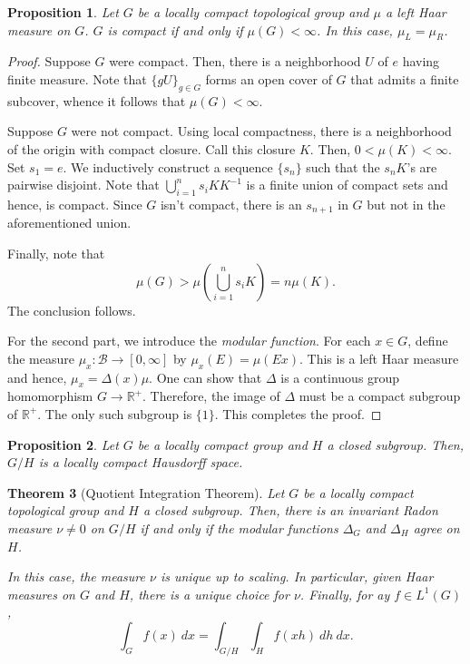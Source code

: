 \documentclass[12pt]{article}
\theoremstyle{thmstyle}
\newtheorem{theorem}{Theorem}[section]
\newtheorem{proposition}[theorem]{Proposition}
\theoremstyle{defstyle}
\newcommand{\R}{\mathbb{R}}
\newcommand{\scrB}{\mathscr B}
\begin{document}
\begin{proposition}
    Let $G$ be a locally compact topological group and $\mu$ a left Haar measure on $G$. $G$ is compact if and only if $\mu(G) < \infty$. In this case, $\mu_L = \mu_R$.
\end{proposition}
\begin{proof}
    Suppose $G$ were compact. Then, there is a neighborhood $U$ of $e$ having finite measure. Note that $\{gU\}_{g\in G}$ forms an open cover of $G$ that admits a finite subcover, whence it follows that $\mu(G) < \infty$.
    
    Suppose $G$ were not compact. Using local compactness, there is a neighborhood of the origin with compact closure. Call this closure $K$. Then, $0 < \mu(K) < \infty$. Set $s_1 = e$. We inductively construct a sequence $\{s_n\}$ such that the $s_nK$'s are pairwise disjoint. Note that $\bigcup_{i = 1}^n s_i KK^{-1}$ is a finite union of compact sets and hence, is compact. Since $G$ isn't compact, there is an $s_{n + 1}$ in $G$ but not in the aforementioned union. 

    Finally, note that 
    \begin{equation*}
        \mu(G) > \mu\left(\bigcup_{i = 1}^n s_iK\right) = n\mu(K).
    \end{equation*}
    The conclusion follows.

    For the second part, we introduce the \emph{modular function}. For each $x\in G$, define the measure $\mu_x:\scrB\to[0,\infty]$ by $\mu_x(E) = \mu(Ex)$. This is a left Haar measure and hence, $\mu_x = \Delta(x)\mu$. One can show that $\Delta$ is a continuous group homomorphism $G\to\R^+$. Therefore, the image of $\Delta$ must be a compact subgroup of $\R^+$. The only such subgroup is $\{1\}$. This completes the proof.
\end{proof}

\begin{proposition}
    Let $G$ be a locally compact group and $H$ a closed subgroup. Then, $G/H$ is a locally compact Hausdorff space.
\end{proposition}

\begin{theorem}[Quotient Integration Theorem]
    Let $G$ be a locally compact topological group and $H$ a closed subgroup. Then, there is an invariant Radon measure $\nu\ne 0$ on $G/H$ if and only if the modular functions $\Delta_G$ and $\Delta_H$ agree on $H$. 

    In this case, the measure $\nu$ is unique up to scaling. In particular, given Haar measures on $G$ and $H$, there is a unique choice for $\nu$. Finally, for ay $f\in L^1(G)$, 
    \begin{equation*}
        \int_G f(x)~dx = \int_{G/H} \int_H f(xh)~dh~dx.
    \end{equation*}
\end{theorem}
\end{document}
